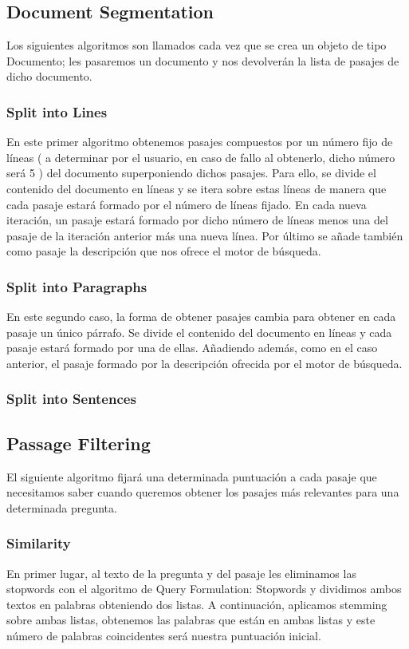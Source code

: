 \documentclass[12pt,a4paper,titlepage]{article}
\begin{document}
\subsection{Document Segmentation}
Los siguientes algoritmos son llamados cada vez que se crea un objeto de tipo Documento; les pasaremos un documento y nos devolverán la lista de pasajes de dicho documento.

\subsubsection{Split into Lines}
En este primer algoritmo obtenemos pasajes compuestos por un número fijo de líneas ( a determinar por el usuario, en caso de fallo al obtenerlo, dicho número será 5 ) del documento superponiendo dichos pasajes. Para ello, se divide el contenido del documento en líneas y se itera sobre estas líneas de manera que cada pasaje estará formado por el número de líneas fijado. En cada nueva iteración, un pasaje estará formado por dicho número de líneas menos una del pasaje de la iteración anterior más una nueva línea. Por último se añade también como pasaje la descripción que nos ofrece el motor de búsqueda.

\subsubsection{Split into Paragraphs}
En este segundo caso, la forma de obtener pasajes cambia para obtener en cada pasaje un único párrafo. Se divide el contenido del documento en líneas y cada pasaje estará formado por una de ellas. Añadiendo además, como en el caso anterior, el pasaje formado por la descripción ofrecida por el motor de búsqueda.

\subsubsection{Split into Sentences}

\subsection{Passage Filtering}
El siguiente algoritmo fijará una determinada puntuación a cada pasaje que necesitamos saber cuando queremos obtener los pasajes más relevantes para una determinada pregunta.

\subsubsection{Similarity}
En primer lugar, al texto de la pregunta y del pasaje les eliminamos las stopwords con el algoritmo de Query Formulation: Stopwords y dividimos ambos textos en palabras obteniendo dos listas. A continuación, aplicamos stemming sobre ambas listas, obtenemos las palabras que están en ambas listas y este número de palabras coincidentes será nuestra puntuación inicial.
\end{document}

